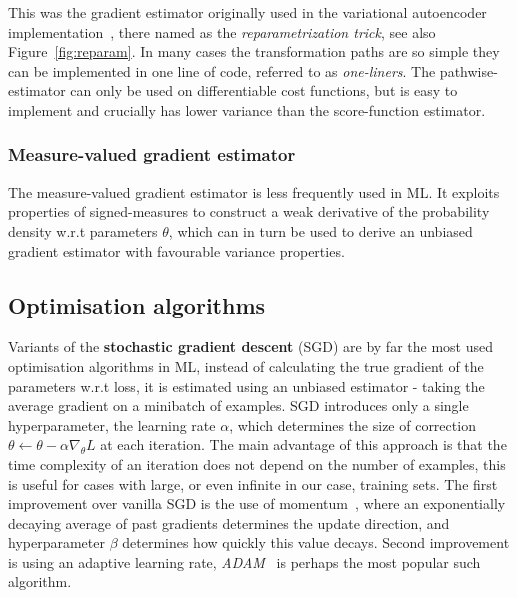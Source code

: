 This was the gradient estimator originally used in the variational autoencoder implementation~\cite{kingma2013auto}, there named as the \emph{reparametrization trick}, see also Figure~\ref{fig:reparam}. In many cases the transformation paths are so simple they can be implemented in one line of code, referred to as \emph{one-liners}. The pathwise-estimator can only be used on differentiable cost functions, but is easy to implement and crucially has lower variance than the score-function estimator. 

\subsubsection{Measure-valued gradient estimator}
The measure-valued gradient estimator is less frequently used in ML. It exploits properties of signed-measures to construct a weak derivative of the probability density w.r.t parameters $\theta$, which can in turn be used to derive an unbiased gradient estimator with favourable variance properties. 

\subsection{Optimisation algorithms}
Variants of the \textbf{stochastic gradient descent} (SGD) are by far the most used optimisation algorithms in ML, instead of calculating the true gradient of the parameters w.r.t loss, it is estimated using an unbiased estimator - taking the average gradient on a minibatch of examples. SGD introduces only a single hyperparameter, the learning rate $\alpha$, which determines the size of correction $\theta \leftarrow \theta - \alpha \nabla_\theta L$ at each iteration. The main advantage of this approach is that the time complexity of an iteration does not depend on the number of examples, this is useful for cases with large, or even infinite in our case, training sets. The first improvement over vanilla SGD is the use of momentum~\cite{polyak1964some}, where an exponentially decaying average of past gradients determines the update direction, and hyperparameter $\beta$ determines how quickly this value decays. Second improvement is using an adaptive learning rate, \emph{ADAM}~\cite{kingma2014adam} is perhaps the most popular such algorithm. 

